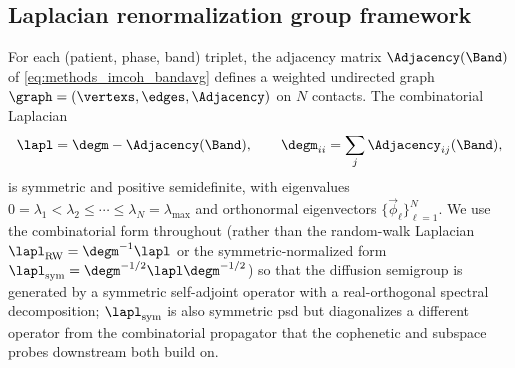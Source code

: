 \subsection{Laplacian renormalization group framework}
    \label{ssec:methods_lrg}
%
For each (patient, phase, band) triplet, the adjacency matrix \(\Adjacency(\Band)\) of \eqref{eq:methods_imcoh_bandavg} defines a weighted undirected graph \(\graph = (\vertexs, \edges, \Adjacency)\) on \(N\) contacts. The combinatorial Laplacian
\begin{equation}
    \lapl = \degm - \Adjacency(\Band), \qquad \degm_{ii} = \sum_{j} \Adjacency_{ij}(\Band),
    \label{eq:methods_laplacian}
\end{equation}
is symmetric and positive semidefinite, with eigenvalues \(0 = \lambda_{1} < \lambda_{2} \le \cdots \le \lambda_{N} = \lambda_{\max}\) and orthonormal eigenvectors \(\{\vec{\phi}_{\ell}\}_{\ell=1}^{N}\). We use the combinatorial form throughout (rather than the random-walk Laplacian \(\lapl_{\rm RW} = \degm^{-1}\lapl\) or the symmetric-normalized form \(\lapl_{\rm sym} = \degm^{-1/2} \lapl \degm^{-1/2}\)) so that the diffusion semigroup is generated by a symmetric self-adjoint operator with a real-orthogonal spectral decomposition; \(\lapl_{\rm sym}\) is also symmetric \gls{psd} but diagonalizes a different operator from the combinatorial propagator that the cophenetic and subspace probes downstream both build on.

